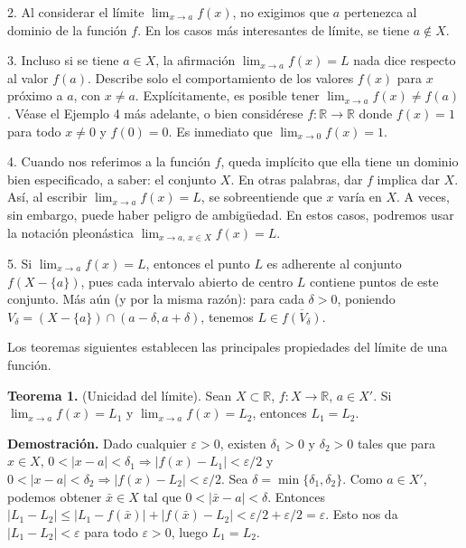 \documentclass[12pt,oneside]{book}
\begin{document}
2. Al considerar el límite \( \lim_{x \to a} f(x) \), no exigimos que \( a \) pertenezca al dominio de la función \( f \). En los casos más interesantes de límite, se tiene \( a \notin X \).

3. Incluso si se tiene \( a \in X \), la afirmación \( \lim_{x \to a} f(x) = L \) nada dice respecto al valor \( f(a) \). Describe solo el comportamiento de los valores \( f(x) \) para \( x \) próximo a \( a \), con \( x \neq a \). Explícitamente, es posible tener \( \lim_{x \to a} f(x) \neq f(a) \). Véase el Ejemplo 4 más adelante, o bien considérese \( f: \mathbb{R} \to \mathbb{R} \) donde \( f(x) = 1 \) para todo \( x \neq 0 \) y \( f(0) = 0 \). Es inmediato que \( \lim_{x \to 0} f(x) = 1 \).

4. Cuando nos referimos a la función \( f \), queda implícito que ella tiene un dominio bien especificado, a saber: el conjunto \( X \). En otras palabras, dar \( f \) implica dar \( X \). Así, al escribir \( \lim_{x \to a} f(x) = L \), se sobreentiende que \( x \) varía en \( X \). A veces, sin embargo, puede haber peligro de ambigüedad. En estos casos, podremos usar la notación pleonástica \( \lim_{x \to a,\, x \in X} f(x) = L \).

5. Si \( \lim_{x \to a} f(x) = L \), entonces el punto \( L \) es adherente al conjunto \( f(X - \{a\}) \), pues cada intervalo abierto de centro \( L \) contiene puntos de este conjunto. Más aún (y por la misma razón): para cada \( \delta > 0 \), poniendo \( V_{\delta} = (X - \{a\}) \cap (a - \delta, a + \delta) \), tenemos \( L \in \overline{f(V_{\delta})} \).

Los teoremas siguientes establecen las principales propiedades del límite de una función.

\textbf{Teorema 1.} (Unicidad del límite). Sean \( X \subset \mathbb{R} \), \( f: X \to \mathbb{R} \), \( a \in X' \). Si \( \lim_{x \to a} f(x) = L_1 \) y \( \lim_{x \to a} f(x) = L_2 \), entonces \( L_1 = L_2 \).

\textbf{Demostración.} Dado cualquier \( \varepsilon > 0 \), existen \( \delta_1 > 0 \) y \( \delta_2 > 0 \) tales que para \( x \in X \), \( 0 < |x - a| < \delta_1 \Rightarrow |f(x) - L_1| < \varepsilon/2 \) y \( 0 < |x - a| < \delta_2 \Rightarrow |f(x) - L_2| < \varepsilon/2 \). Sea \( \delta = \min\{\delta_1, \delta_2\} \). Como \( a \in X' \), podemos obtener \( \bar{x} \in X \) tal que \( 0 < |\bar{x} - a| < \delta \). Entonces \( |L_1 - L_2| \leq |L_1 - f(\bar{x})| + |f(\bar{x}) - L_2| < \varepsilon/2 + \varepsilon/2 = \varepsilon \). Esto nos da \( |L_1 - L_2| < \varepsilon \) para todo \( \varepsilon > 0 \), luego \( L_1 = L_2 \).
\end{document}

